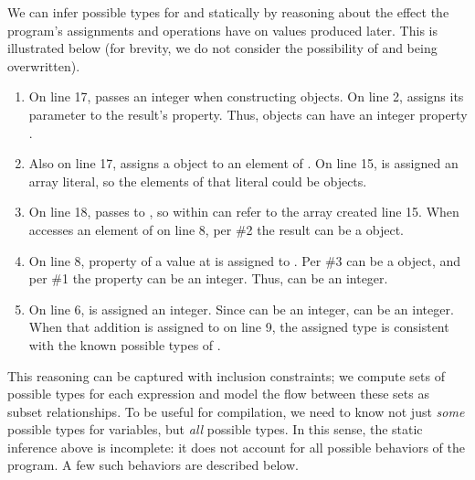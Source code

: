 We can infer possible types for  and  statically
by reasoning about the effect the program's assignments
and operations have on values produced later.
This is illustrated below (for brevity, we do not consider
the possibility of  and  being overwritten).

\begin{enumerate}
\item On line 17,  passes an integer when constructing 
      objects. On line 2,  assigns its parameter to the result's
       property. Thus,  objects can have an
      integer property .
\item Also on line 17,  assigns a  object to an element
      of . On line 15,  is assigned an array literal,
      so the elements of that literal could be  objects.
\item On line 18,  passes  to , so 
      within  can refer to the array created line 15.
      When  accesses an element of  on line 8,
      per \#2 the result can be a  object.
\item On line 8, property  of a value at  is assigned to .
      Per \#3  can be a  object, and per \#1 the
       property can be an integer. Thus,  can be an integer.
\item On line 6,  is assigned an integer. Since  can be
      an integer,  can be an integer.
      When that addition is assigned to  on line 9, the assigned
      type is consistent with the known possible types of .
\end{enumerate}

This reasoning can be captured with inclusion constraints; we compute
sets of possible types for each expression and model the flow between
these sets as subset relationships.
To be useful for compilation, we need to know not just \emph{some}
possible types for variables, but \emph{all} possible types.
In this sense, the static inference above is incomplete: it does not account
for all possible behaviors of the program.
A few such behaviors are described below.


